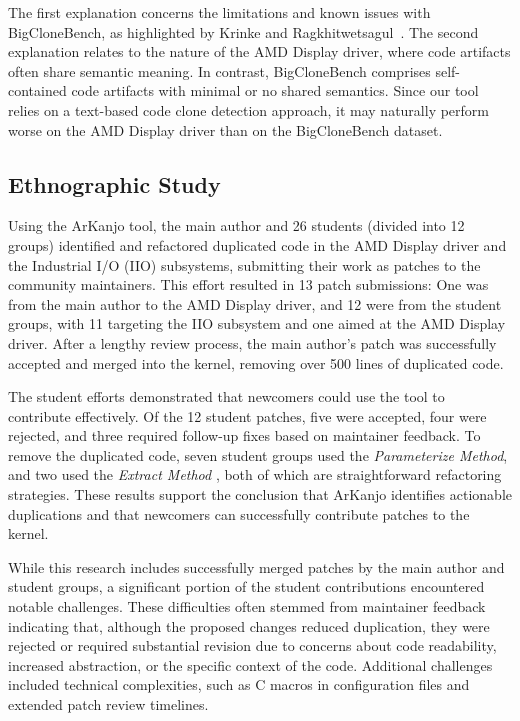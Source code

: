 \documentclass[conference]{IEEEtran}
\begin{document}
The first explanation concerns the limitations and known issues with BigCloneBench, as
highlighted by Krinke and Ragkhitwetsagul~\cite{bigfail}. The
second explanation relates to the nature of the AMD Display driver, where code artifacts
often share semantic meaning. In contrast, BigCloneBench comprises self-contained code
artifacts with minimal or no shared semantics. Since our tool relies on a text-based code clone
detection approach, it may naturally perform worse on the AMD Display driver than on the
BigCloneBench dataset.

\subsection{Ethnographic Study}

Using the ArKanjo tool, the main author and 26 students (divided into 12 groups) identified and refactored duplicated code in the AMD Display driver and the Industrial I/O (IIO) subsystems, submitting their work 
as patches to the community maintainers. This effort resulted in 13 patch submissions: 
One was from the main author to the AMD Display driver, and 12 were from the student groups, with 11 targeting 
the IIO subsystem and one aimed at the AMD Display driver. After a lengthy review process, the main author's patch was successfully accepted and merged into the kernel, removing over 500 lines of duplicated code.

The student efforts demonstrated that newcomers could use the tool to contribute effectively. 
Of the 12 student patches, five were accepted, four were rejected, and three required follow-up 
fixes based on maintainer feedback. To remove the duplicated code, seven student groups used the 
\textit{Parameterize Method}, and two used the \textit{Extract Method} \cite{refactorbook}, both of which are 
straightforward refactoring strategies. These results support the conclusion that ArKanjo identifies 
actionable duplications and that newcomers can successfully contribute patches to the kernel.

While this research includes successfully merged patches by the main author and student groups,
a significant portion of the student contributions encountered notable challenges. These difficulties 
often stemmed from maintainer feedback indicating that, although the proposed changes reduced duplication, 
they were rejected or required substantial revision due to concerns about code readability, increased abstraction, 
or the specific context of the code. Additional challenges included technical complexities, such as C macros in 
configuration files and extended patch review timelines. 
\end{document}

